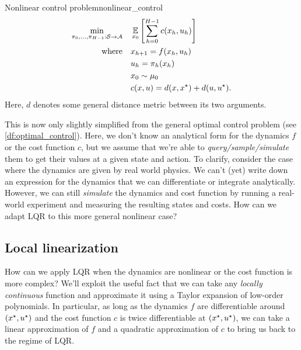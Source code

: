 \documentclass[\main/main]{subfiles}
\begin{document}
\begin{definition}{Nonlinear control problem}{nonlinear_control}
\begin{align*}
    \min_{\pi_0, \dots, \pi_{H-1} : \mathcal{S} \to \mathcal{A}} \quad & \operatorname*{\mathbb{E}}_{x_0} \left[ \sum_{h=0}^{H-1} c(x_h, u_h) \right] \\
    \text{where} \quad & x_{h+1} = f(x_h, u_h) \\
    & u_h = \pi_h(x_h) \\
    & x_0 \sim \mu_0 \\
    & c(x, u) = d(x, x^\star) + d(u, u^\star).
\end{align*}
Here, $d$ denotes some general distance metric between its two arguments.
\end{definition}

This is now only slightly simplified from the general optimal control problem (see \ref{df:optimal_control}). Here, we don't know an analytical form for the dynamics $f$ or the cost function $c$,
but we assume that we're able to \emph{query/sample/simulate} them to get their values at a given state and action.
To clarify, consider the case where the dynamics are given by real world physics.
We can't (yet) write down an expression for the dynamics that we can differentiate or integrate analytically.
However, we can still \emph{simulate} the dynamics and cost function by running a real-world experiment and measuring the resulting states and costs.
How can we adapt LQR to this more general nonlinear case?

\subsection{Local linearization}

How can we apply LQR when the dynamics are nonlinear or the cost function is more complex?
We'll exploit the useful fact that we can take any \emph{locally continuous} function and approximate it using a Taylor expansion of low-order polynomials.
In particular, as long as the dynamics $f$ are differentiable around $(x^\star, u^\star)$ and the cost function $c$ is twice differentiable at $(x^\star, u^\star)$, we can take a linear approximation of $f$ and a quadratic approximation of $c$ to bring us back to the regime of LQR.
\end{document}
